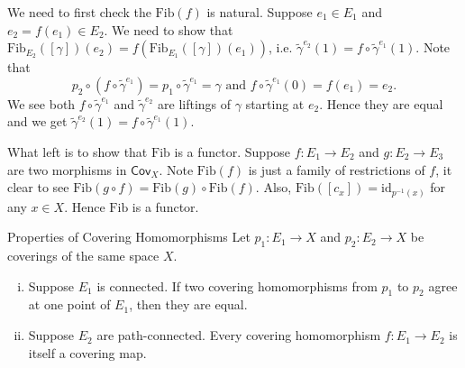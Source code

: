 \documentclass{report}
\begin{document}
\begin{prf}
	We need to first check the $\mathrm{Fib}(f)$ is natural. Suppose $e_1\in E_1$ and $e_2=f(e_1)\in E_2$. We need to show that $\mathrm{Fib}_{E_2}([\gamma])(e_2)=f(\mathrm{Fib}_{E_1}([\gamma])(e_1))$, i.e. $\widetilde{\gamma}^{e_2}(1)=f\circ \widetilde{\gamma}^{e_1}(1)$. Note that 
	$$
	p_2\circ \left(f\circ  \widetilde{\gamma}^{e_1}\right)=p_1\circ  \widetilde{\gamma}^{e_1}=\gamma\text{ and }f\circ  \widetilde{\gamma}^{e_1}(0)=f(e_1)=e_2.
	$$
	 We see both $f\circ  \widetilde{\gamma}^{e_1}$ and $\widetilde{\gamma}^{e_2}$ are liftings of $\gamma$ starting at $e_2$. Hence they are equal and we get $\widetilde{\gamma}^{e_2}(1)=f\circ \widetilde{\gamma}^{e_1}(1)$.

	What left is to show that $\mathrm{Fib}$ is a functor. Suppose $f:E_1\to E_2$ and $g:E_2\to E_3$ are two morphisms in $\mathsf{Cov}_X$. Note $\mathrm{Fib}(f)$ is just a family of restrictions of $f$, it clear to see $\mathrm{Fib}(g\circ f)=\mathrm{Fib}(g)\circ \mathrm{Fib}(f)$. Also, $\mathrm{Fib}([c_x])=\mathrm{id}_{p^{-1}(x)}$ for any $x\in X$. Hence $\mathrm{Fib}$ is a functor.
\end{prf}


\begin{proposition}{Properties of Covering Homomorphisms}{}
	Let $p_1: E_1 \rightarrow X$ and $p_2: E_2 \rightarrow X$ be coverings of the same space $X$.
	\begin{enumerate}[(i)]
		\item Suppose $E_1$ is connected. If two covering homomorphisms from $p_1$ to $p_2$ agree at one point of $E_1$, then they are equal.
		\item Suppose $E_2$ are path-connected. Every covering homomorphism $f: E_1 \to E_2$ is itself a covering map.
	\end{enumerate}

\end{proposition}
\end{document}
